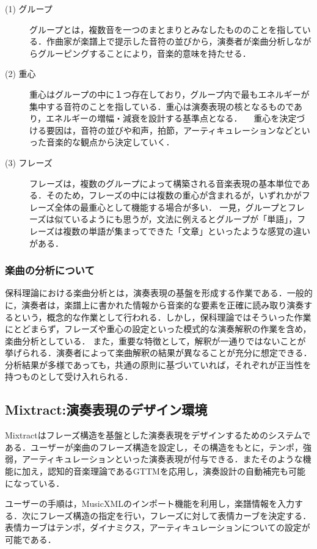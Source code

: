 \begin{description}
	\item[(1)  グループ]
グループとは，複数音を一つのまとまりとみなしたもののことを指している．作曲家が楽譜上で提示した音符の並びから，演奏者が楽曲分析しながらグルーピングすることにより，音楽的意味を持たせる．
	\item[(2) 重心]
重心はグループの中に１つ存在しており，グループ内で最もエネルギーが集中する音符のことを指している．重心は演奏表現の核となるものであり，エネルギーの増幅・減衰を設計する基準点となる．
　重心を決定づける要因は，音符の並びや和声，拍節，アーティキュレーションなどといった音楽的な観点から決定していく．
	\item[(3) フレーズ]
フレーズは，複数のグループによって構築される音楽表現の基本単位である．そのため，フレーズの中には複数の重心が含まれるが，いずれかがフレーズ全体の最重心として機能する場合が多い．
一見，グループとフレーズは似ているようにも思うが，文法に例えるとグループが「単語」，フレーズは複数の単語が集まってできた「文章」といったような感覚の違いがある．

\end{description}

\subsubsection{楽曲の分析について}
保科理論における楽曲分析とは，演奏表現の基盤を形成する作業である．一般的に，演奏者は，楽譜上に書かれた情報から音楽的な要素を正確に読み取り演奏するという，概念的な作業として行われる．しかし，保科理論ではそういった作業にとどまらず，フレーズや重心の設定といった模式的な演奏解釈の作業を含め，楽曲分析としている．
また，重要な特徴として，解釈が一通りではないことが挙げられる．演奏者によって楽曲解釈の結果が異なることが充分に想定できる．分析結果が多様であっても，共通の原則に基づいていれば，それぞれが正当性を持つものとして受け入れられる．


\subsection{Mixtract:演奏表現のデザイン環境}
Mixtract\cite{mixtract}はフレーズ構造を基盤とした演奏表現をデザインするためのシステムである．ユーザーが楽曲のフレーズ構造を設定し，その構造をもとに，テンポ，強弱，アーティキュレーションといった演奏表現が付与できる．またそのような機能に加え，認知的音楽理論であるGTTM\cite{gttm83}を応用し，演奏設計の自動補完も可能になっている．

ユーザーの手順は，MusicXMLのインポート機能を利用し，楽譜情報を入力する．次にフレーズ構造の指定を行い，フレーズに対して表情カーブを決定する．表情カーブはテンポ，ダイナミクス，アーティキュレーションについての設定が可能である．

